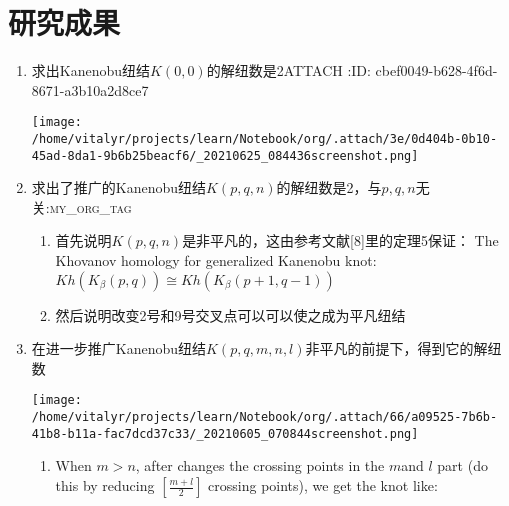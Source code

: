 \documentclass[bigger]{beamer}
\begin{document}
\section{研究成果}
\label{sec:org91037ab}
\begin{enumerate}
\item 求出Kanenobu纽结\(K(0, 0)\)的解纽数是2\hfill{}\textsc{ATTACH}
\label{sec:orge7b3698}
:ID:       cbef0049-b628-4f6d-8671-a3b10a2d8ce7
\begin{center}
\texttt{[image: /home/vitalyr/projects/learn/Notebook/org/.attach/3e/0d404b-0b10-45ad-8da1-9b6b25beacf6/\_20210625\_084436screenshot.png]}
\end{center}
\item 求出了推广的Kanenobu纽结\(K(p, q, n)\)的解纽数是2，与\(p, q, n\)无关:\hfill{}\textsc{my\_org\_tag}
\label{sec:org3a62550}
\begin{enumerate}
\item 首先说明\(K(p, q, n)\)是非平凡的，这由参考文献[8]里的定理5保证：
\label{sec:org3b3a10b}
The Khovanov homology for generalized Kanenobu knot:
\(Kh(K_{\beta}(p,q)) \cong Kh(K_{\beta}(p+1, q-1))\)
\item 然后说明改变2号和9号交叉点可以可以使之成为平凡纽结
\label{sec:orgfafc264}
\end{enumerate}

\item 在进一步推广Kanenobu纽结\(K(p, q, m, n, l)\)非平凡的前提下，得到它的解纽数
\label{sec:orgc1354c9}
\begin{center}
\texttt{[image: /home/vitalyr/projects/learn/Notebook/org/.attach/66/a09525-7b6b-41b8-b11a-fac7dcd37c33/\_20210605\_070844screenshot.png]}
\end{center}

\begin{enumerate}
\item When \(m>n\), after changes the crossing points in the \(m\)and \(l\) part (do this by reducing \([\frac{m+l}{2}]\) crossing points), we get the knot like:
\label{sec:org30d6c5a}


\end{enumerate}
\end{enumerate}
\end{document}
